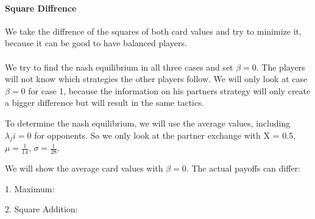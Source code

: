 \paragraph{Square Diffrence} We take the diffrence of the squares of both card values and try to minimize it, because it can be good to have balanced players. 
\\
\\
We try to find the nash equilibrium in all three cases and set $\beta = 0$. The players will not know which strategies the other players follow. We will only look at case $\beta = 0$ for case 1, because the information on his partners strategy will only create a bigger difference but will result in the same tactics. 

To determine the nash equilibrium, we will use the average values, including $\lambda_ji = 0$ for opponents. So we only look at the partner exchange with X = 0.5, $\mu = \frac{1}{14}$, $\sigma = \frac{1}{28}$.

We will show the average card values with $\beta =0$. The actual payoffs can differ:
\begin{table}[h]
\end{table}

1. Maximum:
\begin{table}[h]
\end{table}

2. Square Addition:
\begin{table}[h]
\end{table}

